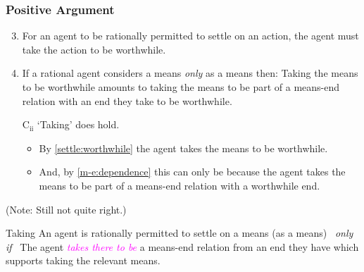 \documentclass[noamssymb, compress, handout]{beamer} %
\newcommand{\hozlinedash}[0]{%
  \noindent\hdashrule[0.5ex][c]{\textwidth}{.1pt}{2.5pt}
}
\begin{document}
\begin{frame}
    \frametitle{Positive Argument}

  \begin{enumerate}
    \setcounter{enumi}{2}
  \item\label{settle:worthwhile} For an agent to be rationally permitted to settle on an action, the agent must take the action to be worthwhile.
  \item\label{m-e:dependence} If a rational agent considers a means \emph{only} as a means then: \newline Taking the means to be worthwhile amounts to taking the means to be part of a means-end relation with an end they take to be worthwhile.
    \item[C\(_{\text{ii}}\)] `Taking' does hold.
    \begin{itemize}
    \item By \ref{settle:worthwhile} the agent takes the means to be worthwhile.
    \item And, by \ref{m-e:dependence} this can only be because the agent takes the means to be part of a means-end relation with a worthwhile end.
    \end{itemize}
  \end{enumerate}

  (Note: Still not quite right.)

  \hozlinedash

  {\footnotesize
    \begin{block}{Taking}
      An agent is rationally permitted to settle on a means (as a means)
      \newline
      \mbox{ }\hfill\emph{only if}\hfill\mbox{ }
      \newline
      The agent \textcolor{fuchsia}{\emph{takes there to be}}  a means-end relation from an end they have which supports taking the relevant means.
    \end{block}
  }
\end{frame}
\end{document}
